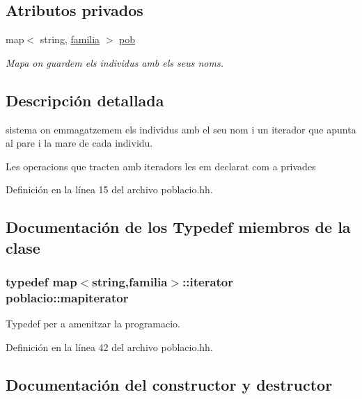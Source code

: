 \subsection*{Atributos privados}
\begin{DoxyCompactItemize}
\item 
map$<$ string, \hyperlink{structpoblacio_1_1familia}{familia} $>$ \hyperlink{classpoblacio_a7ecb70033b151a937143b07d489c4c17}{pob}
\begin{DoxyCompactList}\small\item\em Mapa on guardem els individus amb els seus noms. \end{DoxyCompactList}\end{DoxyCompactItemize}


\subsection{Descripción detallada}
sistema on emmagatzemem els individus amb el seu nom i un iterador que apunta al pare i la mare de cada individu. 

Les operacions que tracten amb iteradors les em declarat com a privades 

Definición en la línea 15 del archivo poblacio.\+hh.



\subsection{Documentación de los \textquotesingle{}Typedef\textquotesingle{} miembros de la clase}
\subsubsection[{\texorpdfstring{mapiterator}{mapiterator}}]{\setlength{\rightskip}{0pt plus 5cm}typedef map$<$string,{\bf familia}$>$\+::iterator {\bf poblacio\+::mapiterator}\hspace{0.3cm}{\ttfamily [private]}}\hypertarget{classpoblacio_a52c3d96b08f7679f27487e7499185ed1}{}\label{classpoblacio_a52c3d96b08f7679f27487e7499185ed1}


Typedef per a amenitzar la programacio. 



Definición en la línea 42 del archivo poblacio.\+hh.



\subsection{Documentación del constructor y destructor}
